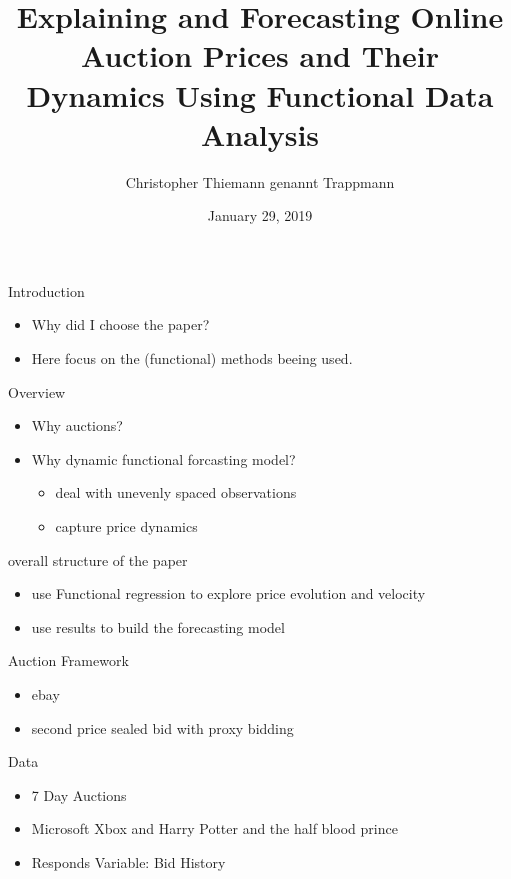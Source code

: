 \documentclass[hyperref={pdfpagelabels=false}]{beamer}
\title{Explaining and Forecasting Online Auction
Prices and Their Dynamics Using
Functional Data Analysis}
\author{Christopher Thiemann genannt Trappmann}
\date{January 29, 2019}
\begin{document}
\begin{frame}
\titlepage
\end{frame}

\begin{frame}{Introduction} %
\begin{itemize}
	\item Why did I choose the paper? %
	\item Here focus on the (functional) methods beeing used.
\end{itemize}
\end{frame}

\begin{frame}{Overview}
\begin{itemize}
	\item Why auctions? %
	\item Why dynamic functional forcasting model?
	\begin{itemize}
		\item deal with unevenly spaced observations
		\item capture price dynamics
	\end{itemize}	
\end{itemize}
overall structure of the paper
\begin{itemize}
	\item use Functional regression to explore price evolution and velocity
	\item use results to build the forecasting model
\end{itemize}
\end{frame}

\begin{frame}{Auction Framework}
\begin{itemize}
	\item ebay
	\item second price sealed bid with proxy bidding
\end{itemize}
Data
\begin{itemize}
	\item 7 Day Auctions
	\item Microsoft Xbox and Harry Potter and the half blood prince
	\item Responds Variable: Bid History
\end{itemize}
\end{frame}
\end{document}
